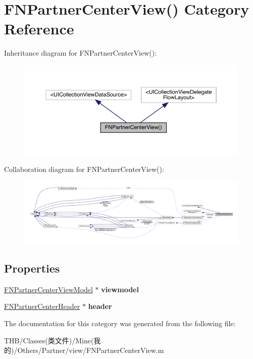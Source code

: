 \hypertarget{category_f_n_partner_center_view_07_08}{}\section{F\+N\+Partner\+Center\+View() Category Reference}
\label{category_f_n_partner_center_view_07_08}


Inheritance diagram for F\+N\+Partner\+Center\+View()\+:\nopagebreak
\begin{figure}[H]
\begin{center}
\leavevmode
\includegraphics[width=350pt]{category_f_n_partner_center_view_07_08__inherit__graph}
\end{center}
\end{figure}


Collaboration diagram for F\+N\+Partner\+Center\+View()\+:\nopagebreak
\begin{figure}[H]
\begin{center}
\leavevmode
\includegraphics[width=350pt]{category_f_n_partner_center_view_07_08__coll__graph}
\end{center}
\end{figure}
\subsection*{Properties}
\begin{DoxyCompactItemize}
\item 
\mbox{\label{category_f_n_partner_center_view_07_08_aef4683fec5f5ec42a0ec8d41a05d11f0}} 
\mbox{\hyperlink{interface_f_n_partner_center_view_model}{F\+N\+Partner\+Center\+View\+Model}} $\ast$ {\bfseries viewmodel}
\item 
\mbox{\label{category_f_n_partner_center_view_07_08_a216560a06d5dec43306baf1ce61f047d}} 
\mbox{\hyperlink{interface_f_n_partner_center_header}{F\+N\+Partner\+Center\+Header}} $\ast$ {\bfseries header}
\end{DoxyCompactItemize}


The documentation for this category was generated from the following file\+:\begin{DoxyCompactItemize}
\item 
T\+H\+B/\+Classes(类文件)/\+Mine(我的)/\+Others/\+Partner/view/F\+N\+Partner\+Center\+View.\+m\end{DoxyCompactItemize}
